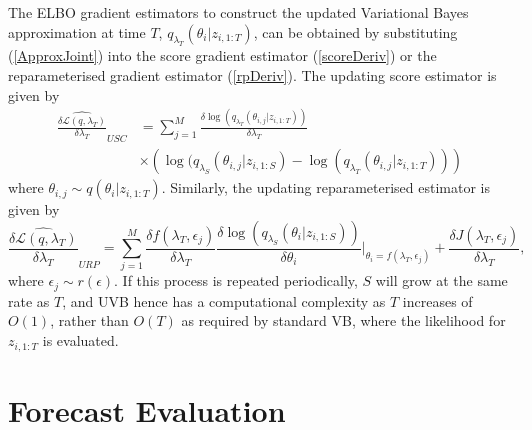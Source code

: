 \documentclass[12pt,a4paper]{article}\usepackage[]{graphicx}\usepackage[]{color}
\begin{document}
The ELBO gradient estimators to construct the updated Variational Bayes approximation at time $T$, $q_{\lambda_T}(\theta_{i} | z_{i, 1:T})$, can be obtained by substituting (\ref{ApproxJoint}) into the score gradient estimator (\ref{scoreDeriv}) or the reparameterised gradient estimator (\ref{rpDeriv}). The updating score estimator is given by
\begin{align}
\widehat{\frac{\delta\mathcal{L}(q, \lambda_T)}{\delta \lambda_T}}_{USC} &= \sum_{j = 1}^M \frac{\delta \log(q_{\lambda_T}(\theta_{i, j} | z_{i, 1:T}))}{\delta \lambda_T} \nonumber \\
&\times \left(\log(q_{\lambda_S}(\theta_{i, j} | z_{i, 1:S}) - \log(q_{\lambda_T}(\theta_{i, j} | z_{i, 1:T})) \right) \label{scoreUpdate}
\end{align}
where $\theta_{i, j} \sim q(\theta_{i} | z_{i, 1:T})$. Similarly, the updating reparameterised estimator is given by
\begin{equation}
\label{rpUpdate}
\widehat{\frac{\delta\mathcal{L}(q, \lambda_T)}{\delta \lambda_T}}_{URP} = \sum_{j = 1}^M \frac{\delta f(\lambda_T, \epsilon_j)}{\delta \lambda_T} \frac{\delta \log(q_{\lambda_S}(\theta_{i} |z_{i, 1:S}))}{\delta \theta_{i}} \bigg\rvert_{\theta_{i} = f(\lambda_T, \epsilon_j)} + \frac{\delta J(\lambda_T, \epsilon_j)}{\delta \lambda_T},
\end{equation}
where $\epsilon_j \sim r(\epsilon)$. If this process is repeated periodically, $S$ will grow at the same rate as $T$, and UVB hence has a computational complexity as $T$ increases of $O(1)$, rather than $O(T)$ as required by standard VB, where the likelihood for $z_{i, 1:T}$ is evaluated. 

\section{Forecast Evaluation}
\label{sec:eval}
\end{document}
